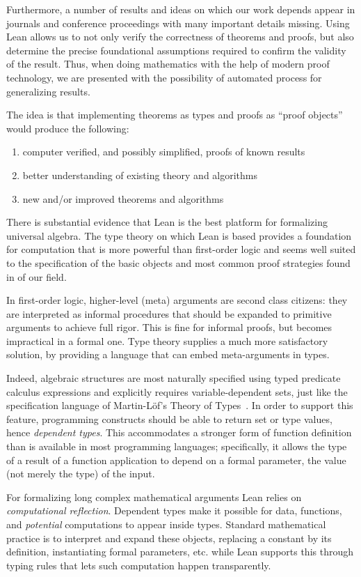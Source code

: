 \documentclass[12pt]{amsart}  %
\begin{document}
Furthermore, a number of results and ideas on which our work depends
appear in journals and conference proceedings with many important details
missing.  Using Lean allows us to not only verify the correctness of theorems and proofs, but
also determine the precise foundational assumptions required to confirm the validity of the result.
Thus, when doing mathematics with the help of modern proof technology, 
we are presented with the possibility of automated process for generalizing results.

The idea is that implementing theorems as types
and proofs as ``proof objects'' would produce the following:
\begin{enumerate}
\item computer verified, and possibly simplified, proofs of known results
\item better understanding of existing theory and algorithms
\item new and/or improved theorems and algorithms
\end{enumerate}

There is substantial evidence that Lean is the best platform for
formalizing universal algebra.  The type theory on which Lean is based provides
a foundation for computation that is more powerful than
first-order logic and seems well suited to the specification of the basic objects
and most common proof strategies found in of our field.

In first-order logic, higher-level (meta) arguments are second class citizens:
they are interpreted as informal procedures that should be expanded to primitive
arguments to achieve full rigor. This is fine for informal proofs, but becomes
impractical in a formal one. Type theory supplies a much more satisfactory
solution, by providing a language that can embed meta-arguments in types. 

Indeed, algebraic structures are most naturally specified using typed predicate calculus
expressions and explicitly requires variable-dependent sets,
just like the specification language of Martin-L\"{o}f's 
Theory of Types~\cite{MR769301}.
In order to support this feature, programming constructs should be
able to return set or type values, hence \emph{dependent types}. 
This accommodates a stronger form of function definition than is available in
most programming languages; specifically, it allows the type of a result of a
function application to depend on a formal parameter, the value (not merely the
type) of the input.

For formalizing long complex mathematical arguments Lean
relies on \emph{computational reflection}.
Dependent types make it possible for data, functions, and \emph{potential}
computations to appear inside types. Standard mathematical practice is
to interpret and expand these objects, 
replacing a constant
by its definition, instantiating formal parameters, etc.
while Lean supports this through typing rules that lets such computation happen 
transparently. 
\end{document}
